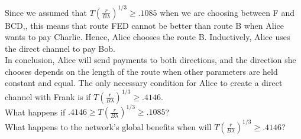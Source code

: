 \documentclass[12pt]{article}
\theoremstyle{plain}
\theoremstyle{remark}
\theoremstyle{definition}
\renewcommand{\geq}{\geqslant}
\renewcommand{\geq}{\geqslant}
\begin{document}
Since we assumed that $T (\frac{r}{B\lambda})^{1/3} \geq .1085$ when we are choosing between F and BCD,, this means that route FED cannot be better than route B when Alice wants to pay Charlie. Hence, Alice chooses the route B. Inductively, Alice uses the direct channel to pay Bob.
\\ In conclusion, Alice will send payments to both directions, and the direction she chooses depends on the length of the route when other parameters are held constant and equal. The only necessary condition for Alice to create a direct channel with Frank is if $T(\frac{r}{B\lambda})^{1/3} \geq .4146$. 
\\ What happens if $.4146 \geq T(\frac{r}{B\lambda})^{1/3} \geq .1085$?
\\ What happens to the network's global benefits when will $T (\frac{r}{B\lambda})^{1/3} \geq .4146$? 
\end{document}
